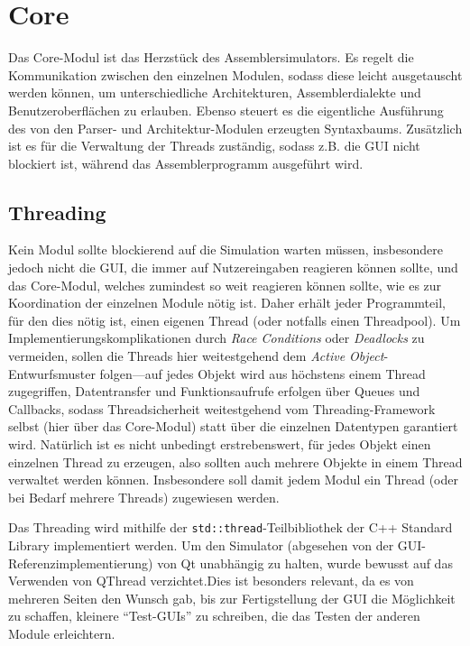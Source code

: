 \chapter{Core}

Das Core-Modul ist das Herzstück des Assemblersimulators. Es regelt die Kommunikation zwischen den einzelnen Modulen, sodass diese leicht ausgetauscht werden können, um unterschiedliche Architekturen, Assemblerdialekte und Benutzeroberflächen zu erlauben. Ebenso steuert es die eigentliche Ausführung des von den Parser- und Architektur-Modulen erzeugten Syntaxbaums. Zusätzlich ist es für die Verwaltung der Threads zuständig, sodass z.B. die GUI nicht blockiert ist, während das Assemblerprogramm ausgeführt wird.

\section{Threading}

Kein Modul sollte blockierend auf die Simulation warten müssen, insbesondere jedoch nicht die GUI, die immer auf Nutzereingaben reagieren können sollte, und das Core-Modul, welches zumindest so weit reagieren können sollte, wie es zur Koordination der einzelnen Module nötig ist.
Daher erhält jeder Programmteil, für den dies nötig ist, einen eigenen Thread (oder notfalls einen Threadpool). Um Implementierungskomplikationen durch \textit{Race Conditions} oder \textit{Deadlocks} zu vermeiden, sollen die Threads hier weitestgehend dem \textit{Active Object}-Entwurfsmuster folgen---auf jedes Objekt wird aus höchstens einem  Thread zugegriffen, Datentransfer und Funktionsaufrufe erfolgen über Queues und Callbacks, sodass Threadsicherheit weitestgehend vom Threading-Framework selbst (hier über das Core-Modul) statt über die einzelnen Datentypen garantiert wird. Natürlich ist es nicht unbedingt erstrebenswert, für jedes Objekt einen einzelnen Thread zu erzeugen, also sollten auch mehrere Objekte in einem Thread verwaltet werden können. Insbesondere soll damit jedem Modul ein Thread (oder bei Bedarf mehrere Threads) zugewiesen werden. 

Das Threading wird mithilfe der \lstinline[style=C++]!std::thread!-Teilbibliothek der C++ Standard Library implementiert werden. Um den Simulator (abgesehen von der GUI-Referenzimplementierung) von Qt unabhängig zu halten, wurde bewusst auf das Verwenden von QThread verzichtet.Dies ist besonders relevant, da es von mehreren Seiten den Wunsch gab, bis zur Fertigstellung der GUI die Möglichkeit zu schaffen, kleinere ``Test-GUIs'' zu schreiben, die das Testen der anderen Module erleichtern.

